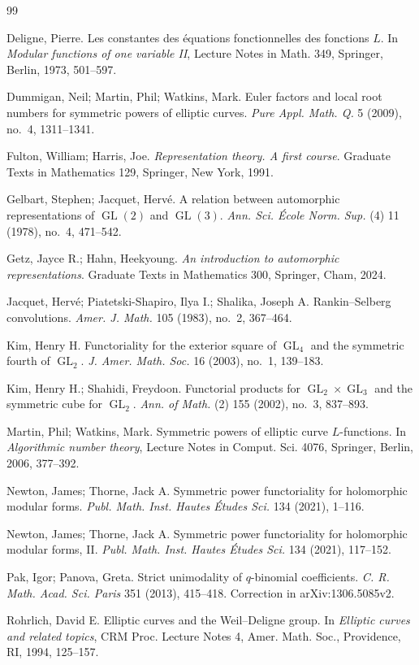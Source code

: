 \documentclass[11pt,reqno]{amsart}
\theoremstyle{definition}
\theoremstyle{remark}
\newcommand{\GL}{\operatorname{GL}}
\begin{document}
\begin{thebibliography}{99}

Deligne, Pierre.
Les constantes des \'equations fonctionnelles des fonctions $L$.
In \emph{Modular functions of one variable II}, Lecture Notes in Math. 349,
Springer, Berlin, 1973, 501--597.

Dummigan, Neil; Martin, Phil; Watkins, Mark.
Euler factors and local root numbers for symmetric powers of elliptic curves.
\emph{Pure Appl. Math. Q.} 5 (2009), no.~4, 1311--1341.

Fulton, William; Harris, Joe.
\emph{Representation theory. A first course}.
Graduate Texts in Mathematics 129, Springer, New York, 1991.

Gelbart, Stephen; Jacquet, Herv\'e.
A relation between automorphic representations of $\GL(2)$ and $\GL(3)$.
\emph{Ann. Sci. \'Ecole Norm. Sup.} (4) 11 (1978), no.~4, 471--542.

Getz, Jayce R.; Hahn, Heekyoung.
\emph{An introduction to automorphic representations}.
Graduate Texts in Mathematics 300, Springer, Cham, 2024.

Jacquet, Herv\'e; Piatetski-Shapiro, Ilya I.; Shalika, Joseph A.
Rankin--Selberg convolutions.
\emph{Amer. J. Math.} 105 (1983), no.~2, 367--464.

Kim, Henry H.
Functoriality for the exterior square of $\GL_4$ and the symmetric fourth of
$\GL_2$.
\emph{J. Amer. Math. Soc.} 16 (2003), no.~1, 139--183.

Kim, Henry H.; Shahidi, Freydoon.
Functorial products for $\GL_2\times\GL_3$ and the symmetric cube for
$\GL_2$.
\emph{Ann. of Math.} (2) 155 (2002), no.~3, 837--893.

Martin, Phil; Watkins, Mark.
Symmetric powers of elliptic curve $L$-functions.
In \emph{Algorithmic number theory}, Lecture Notes in Comput. Sci. 4076,
Springer, Berlin, 2006, 377--392.

Newton, James; Thorne, Jack A.
Symmetric power functoriality for holomorphic modular forms.
\emph{Publ. Math. Inst. Hautes \'Etudes Sci.} 134 (2021), 1--116.

Newton, James; Thorne, Jack A.
Symmetric power functoriality for holomorphic modular forms, II.
\emph{Publ. Math. Inst. Hautes \'Etudes Sci.} 134 (2021), 117--152.

Pak, Igor; Panova, Greta.
Strict unimodality of $q$-binomial coefficients.
\emph{C. R. Math. Acad. Sci. Paris} 351 (2013), 415--418.
Correction in arXiv:1306.5085v2.

Rohrlich, David E.
Elliptic curves and the Weil--Deligne group.
In \emph{Elliptic curves and related topics}, CRM Proc. Lecture Notes 4,
Amer. Math. Soc., Providence, RI, 1994, 125--157.

\end{thebibliography}
\end{document}
